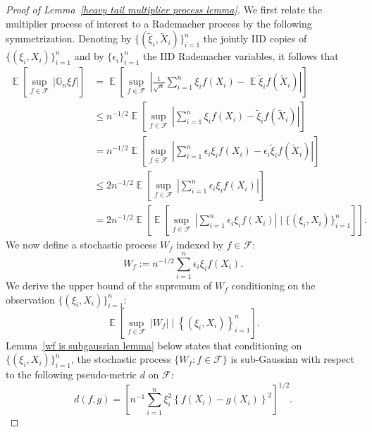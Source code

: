 \documentclass[12pt]{article}
\DeclareMathOperator*{\E}{\mathbb{E}}
\begin{document}
\begin{appendices}
\begin{proof}[Proof of Lemma~\ref{heavy tail multiplier process lemma}]
We first relate the multiplier process of interest to a Rademacher process by the following symmetrization. Denoting by $\{(\tilde\xi_i,\tilde X_i)\}_{i=1}^n$ the jointly IID copies of $\{(\xi_i,X_i)\}_{i=1}^n$ and by $\{\epsilon_i\}_{i=1}^n$ the IID Rademacher variables, it follows that 
\begin{equation}\nonumber
    \begin{aligned}
    \E\left[\sup_{f\in\mathcal{F}}\, \left|\mathbb{G}_n \xi f\right|\right]
    & = \E\left[\sup_{f\in\mathcal{F}}\, \left|\frac{1}{\sqrt{n}}\sum_{i=1}^n \xi_i f(X_i) -\E \tilde\xi_i f(\tilde X_i)\right|\right]\\    %
    &\leq n^{-1/2} \E\left[\sup_{f \in \mathcal{F}} \,\left|\sum_{i=1}^n \xi_i f(X_i) - \tilde \xi_i f(\tilde X_i)\right|\right]\\
    & = n^{-1/2} \E\left[\sup_{f \in \mathcal{F}}\, \left|\sum_{i=1}^n \epsilon_i\xi_i f(X_i) - \epsilon_i\tilde \xi_i f(\tilde X_i)\right|\right]\\    %
    & \leq 2n^{-1/2}\E\left[\sup_{f\in \mathcal{F}} \,\left|\sum_{i=1}^n \epsilon_i \xi_i f(X_i)\right|\right]\\
    & = 2n^{-1/2}\E\left[\E\left[\sup_{f\in \mathcal{F}} \, \left|\sum_{i=1}^n \epsilon_i \xi_i f(X_i)\right| \mid \{(\xi_i,X_i)\}_{i=1}^n\right]\right].
    \end{aligned}
\end{equation}
We now define a stochastic process $W_f$ indexed by $f\in\mathcal{F}$:
\begin{equation}
\label{define wf}
    W_f := n^{-1/2}\sum_{i=1}^n \epsilon_i \xi_i f(X_i).
\end{equation}
We derive the upper bound of the supremum of $W_f$ conditioning on the observation $\{(\xi_i,X_i)\}_{i=1}^n$:
\begin{equation}\nonumber
    \E\left[\sup _{f \in \mathcal{F}}\,\left|W_f\right| \mid\left\{\left(\xi_i, X_i\right)\right\}_{i=1}^n\right].
\end{equation}
Lemma~\ref{wf is subgaussian lemma} below states that conditioning on $\{(\xi_i,X_i)\}_{i=1}^n$, the stochastic process $\{W_f : f \in \mathcal{F}\}$ is sub-Gaussian with respect to the following pseudo-metric $d$ on $\mathcal{F}$:
\begin{equation}\nonumber
    d(f,g) = \left[n^{-1}\sum_{i=1}^n \xi_i^2 \left\{f(X_i) - g(X_i)\right\}^2\right]^{1/2}.
\end{equation}


\end{proof}
\end{appendices}
\end{document}
